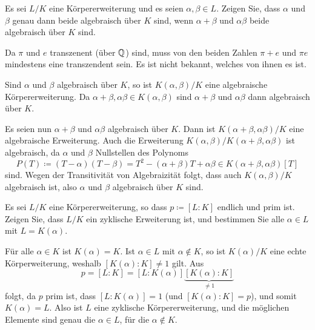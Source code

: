 \begin{question}
  Es sei $L/K$ eine Körpererweiterung und es seien $\alpha, \beta \in L$.
  Zeigen Sie, dass $\alpha$ und $\beta$ genau dann beide algebraisch über $K$ sind, wenn $\alpha + \beta$ und $\alpha \beta$ beide algebraisch über $K$ sind.
\end{question}


\begin{remark*}
  Da $\pi$ und $e$ transzenent (über $\mathbb{Q}$) sind, muss von den beiden Zahlen $\pi + e$ und $\pi e$ mindestens eine transzendent sein.
  Es ist nicht bekannt, welches von ihnen es ist.
\end{remark*}


\begin{solution}
  Sind $\alpha$ und $\beta$ algebraisch über $K$, so ist $K(\alpha, \beta) / K$ eine algebraische Körpererweiterung.
  Da $\alpha + \beta, \alpha \beta \in K(\alpha, \beta)$ sind $\alpha + \beta$ und $\alpha \beta$ dann algebraisch über $K$.
  
  Es seien nun $\alpha + \beta$ und $\alpha \beta$ algebraisch über $K$.
  Dann ist $K(\alpha + \beta, \alpha \beta)/K$ eine algebraische Erweiterung.
  Auch die Erweiterung $K(\alpha, \beta)/K(\alpha + \beta, \alpha \beta)$ ist algebraisch, da $\alpha$ und $\beta$ Nullstellen des Polynoms
  \[
              P(T)
    \coloneqq (T - \alpha)(T - \beta)
    =         T^2 - (\alpha + \beta)T + \alpha \beta
    \in       K(\alpha + \beta, \alpha \beta)[T]
  \]
  sind.
  Wegen der Transitivität von Algebraizität folgt, dass auch $K(\alpha,\beta)/K$ algebraisch ist, also $\alpha$ und $\beta$ algebraisch über $K$ sind.
\end{solution}


\begin{question}
  Es sei $L/K$ eine Körpererweiterung, so dass $p \coloneqq [L : K]$ endlich und prim ist.
  Zeigen Sie, dass $L/K$ ein zyklische Erweiterung ist, und bestimmen Sie alle $\alpha \in L$ mit $L = K(\alpha)$.
\end{question}


\begin{solution}
  Für alle $\alpha \in K$ ist $K(\alpha) = K$.
  Ist $\alpha \in L$ mit $\alpha \notin K$, so ist $K(\alpha)/K$ eine echte Körperweiterung, weshalb $[K(\alpha) : K] \neq 1$ gilt.
  Aus
  \[
      p
    = [L : K]
    = [L : K(\alpha)] \underbrace{[K(\alpha) : K]}_{\neq 1}
  \]
  folgt, da $p$ prim ist, dass $[L : K(\alpha)] = 1$ (und $[K(\alpha) : K] = p$), und somit $K(\alpha) = L$.
  Also ist $L$ eine zyklische Körpererweiterung, und die möglichen Elemente sind genau die $\alpha \in L$, für die $\alpha \notin K$.
\end{solution}



